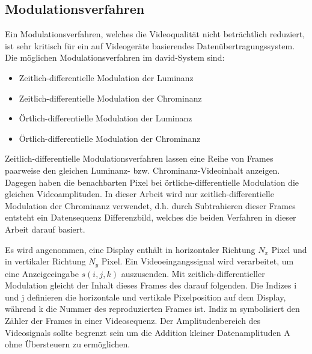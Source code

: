 \subsection{Modulationsverfahren}

Ein Modulationsverfahren, welches die Videoqualität nicht beträchtlich reduziert, ist sehr kritisch für ein auf Videogeräte basierendes Datenübertragungssystem. Die möglichen Modulationsverfahren im \gls{david}-System sind:
\begin{itemize}
	\item Zeitlich-differentielle Modulation der Luminanz
	\item Zeitlich-differentielle Modulation der Chrominanz
	\item Örtlich-differentielle Modulation der Luminanz
	\item Örtlich-differentielle Modulation der Chrominanz
\end{itemize}

Zeitlich-differentielle Modulationsverfahren lassen eine Reihe von Frames paarweise den gleichen Luminanz- bzw. Chrominanz-Videoinhalt anzeigen. Dagegen haben die benachbarten Pixel bei örtliche-differentielle Modulation die gleichen Videoamplituden. In dieser Arbeit wird nur zeitlich-differentielle Modulation der Chrominanz verwendet, d.h. durch Subtrahieren dieser Frames entsteht ein Datensequenz Differenzbild, welches die beiden Verfahren in dieser Arbeit darauf basiert. %


Es wird angenommen, eine Display enthält in horizontaler Richtung $N_x$ Pixel und in vertikaler Richtung $N_y$ Pixel. Ein Videoeingangssignal wird verarbeitet, um eine Anzeigeeingabe $s(i,j,k)$ auszusenden. Mit zeitlich-differentieller Modulation gleicht der Inhalt dieses Frames des darauf folgenden. Die Indizes i und j definieren die horizontale und vertikale Pixelposition auf dem Display, während k die Nummer des reproduzierten Frames ist. Indiz m symbolisiert den Zähler der Frames in einer Videosequenz. Der Amplitudenbereich des Videosignals sollte begrenzt sein um die Addition kleiner Datenamplituden A ohne Übersteuern zu ermöglichen.

